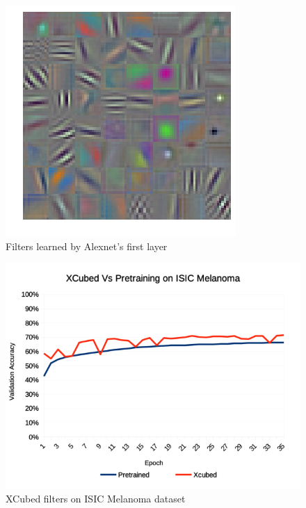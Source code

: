 \documentclass[twocolumn]{article}
\begin{document}
\begin{figure}[ht]
    \centering
    \includegraphics[width=.8\linewidth]{trainedfet}
    \caption{Filters learned by Alexnet's first layer}
    \label{fig:learnedweights}
\end{figure}
\begin{figure}[ht]
    \centering
    \includegraphics[width=.8\linewidth]{x3vpretrained}
    \caption{XCubed filters on ISIC Melanoma dataset}
    \label{fig:melanomacompare}
\end{figure}
\end{document}
